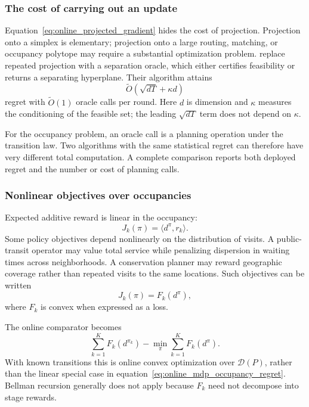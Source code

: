 \subsubsection{The cost of carrying out an update}

Equation~\eqref{eq:online_projected_gradient} hides the cost of projection. Projection onto a simplex is elementary; projection onto a large routing, matching, or occupancy polytope may require a substantial optimization problem. \citet{mhammedi2025separation} replace repeated projection with a separation oracle, which either certifies feasibility or returns a separating hyperplane. Their algorithm attains
\begin{equation}
\widetilde O(\sqrt{dT}+\kappa d)
\label{eq:online_separation_bound}
\end{equation}
regret with $\widetilde O(1)$ oracle calls per round. Here $d$ is dimension and $\kappa$ measures the conditioning of the feasible set; the leading $\sqrt{dT}$ term does not depend on $\kappa$.

For the occupancy problem, an oracle call is a planning operation under the transition law. Two algorithms with the same statistical regret can therefore have very different total computation. A complete comparison reports both deployed regret and the number or cost of planning calls.

\subsubsection{Nonlinear objectives over occupancies}

Expected additive reward is linear in the occupancy:
\[
J_k(\pi)=\langle d^\pi,r_k\rangle.
\]
Some policy objectives depend nonlinearly on the distribution of visits. A public-transit operator may value total service while penalizing dispersion in waiting times across neighborhoods. A conservation planner may reward geographic coverage rather than repeated visits to the same locations. Such objectives can be written
\begin{equation}
J_k(\pi)=F_k(d^\pi),
\label{eq:online_convex_rl_objective}
\end{equation}
where $F_k$ is convex when expressed as a loss.

The online comparator becomes
\begin{equation}
\sum_{k=1}^K F_k(d^{\pi_k})
-
\min_\pi\sum_{k=1}^K F_k(d^\pi).
\label{eq:online_convex_rl_regret}
\end{equation}
With known transitions this is online convex optimization over $\mathcal D(P)$, rather than the linear special case in equation~\eqref{eq:online_mdp_occupancy_regret}. Bellman recursion generally does not apply because $F_k$ need not decompose into stage rewards.

